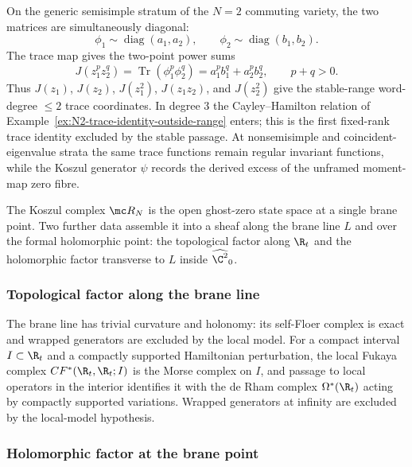 \documentclass[11pt]{memoir}
\begin{document}
\begin{ex}[\(N=2\) commuting-pair trace coordinates]\label{ex:N2-commuting-pair-traces}
  On the generic semisimple stratum of the \(N=2\) commuting variety,
  the two matrices are simultaneously diagonal:
  \[
    \phi_1\sim\operatorname{diag}(a_1,a_2),
    \qquad
    \phi_2\sim\operatorname{diag}(b_1,b_2).
  \]
  The trace map gives the two-point power sums
  \[
    J(z_1^p z_2^q)
      =\operatorname{Tr}(\phi_1^p\phi_2^q)
      =a_1^p b_1^q+a_2^p b_2^q,
    \qquad p+q>0 .
  \]
  Thus \(J(z_1)\), \(J(z_2)\), \(J(z_1^2)\), \(J(z_1z_2)\), and
  \(J(z_2^2)\) give the stable-range word-degree \(\leq2\) trace
  coordinates.  In degree \(3\) the Cayley--Hamilton relation of
  Example~\ref{ex:N2-trace-identity-outside-range} enters; this is the
  first fixed-rank trace identity excluded by the stable passage.
  At nonsemisimple and coincident-eigenvalue strata the same trace
  functions remain regular invariant functions, while the Koszul
  generator \(\psi\) records the derived excess of the unframed
  moment-map zero fibre.
\end{ex}

The Koszul complex \(\mc R_N\) is the open ghost-zero state space at
a single brane point.  Two further data assemble it into a sheaf along
the brane line \(L\) and over the formal holomorphic point: the
topological factor along \(\R_t\) and the holomorphic factor transverse
to \(L\) inside \(\widehat{\C^2}_0\).

\subsubsection*{Topological factor along the brane line}

The brane line has trivial curvature and holonomy: its self-Floer
complex is exact and wrapped generators are excluded by the local
model.
For a compact interval \(I\subset\R_t\) and a compactly supported
Hamiltonian perturbation, the local Fukaya complex
\(CF^*(\R_t,\R_t;I)\) is the Morse complex on \(I\), and passage to
local operators in the interior identifies it with the de Rham
complex \(\Omega^*(\R_t)\) acting by compactly supported variations.
Wrapped generators at infinity are excluded by the local-model
hypothesis.

\subsubsection*{Holomorphic factor at the brane point}
\end{document}
